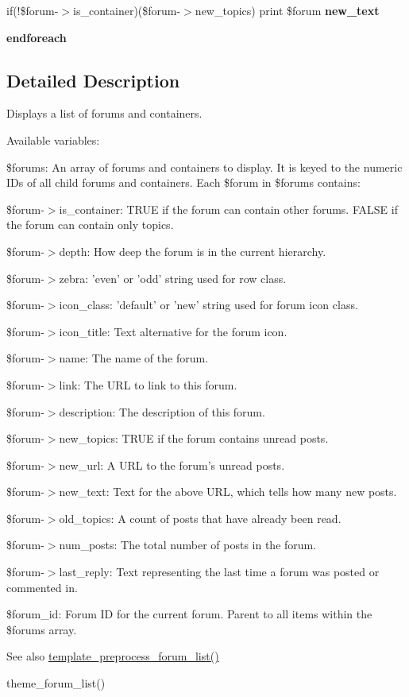 \begin{DoxyCompactItemize}
\item 
\hypertarget{forum-list_8tpl_8php_ae02958244c63e6b4c4a07e5efe312478}{
if(!\$forum-\/$>$is\_\-container)(\$forum-\/$>$new\_\-topics) print \$forum {\bfseries new\_\-text}}
\label{forum-list_8tpl_8php_ae02958244c63e6b4c4a07e5efe312478}

\item 
\hypertarget{forum-list_8tpl_8php_a672d9707ef91db026c210f98cc601123}{
{\bfseries endforeach}}
\label{forum-list_8tpl_8php_a672d9707ef91db026c210f98cc601123}

\end{DoxyCompactItemize}


\subsection{Detailed Description}
Displays a list of forums and containers.

Available variables:
\begin{DoxyItemize}
\item \$forums: An array of forums and containers to display. It is keyed to the numeric IDs of all child forums and containers. Each \$forum in \$forums contains:
\begin{DoxyItemize}
\item \$forum-\/$>$is\_\-container: TRUE if the forum can contain other forums. FALSE if the forum can contain only topics.
\item \$forum-\/$>$depth: How deep the forum is in the current hierarchy.
\item \$forum-\/$>$zebra: 'even' or 'odd' string used for row class.
\item \$forum-\/$>$icon\_\-class: 'default' or 'new' string used for forum icon class.
\item \$forum-\/$>$icon\_\-title: Text alternative for the forum icon.
\item \$forum-\/$>$name: The name of the forum.
\item \$forum-\/$>$link: The URL to link to this forum.
\item \$forum-\/$>$description: The description of this forum.
\item \$forum-\/$>$new\_\-topics: TRUE if the forum contains unread posts.
\item \$forum-\/$>$new\_\-url: A URL to the forum's unread posts.
\item \$forum-\/$>$new\_\-text: Text for the above URL, which tells how many new posts.
\item \$forum-\/$>$old\_\-topics: A count of posts that have already been read.
\item \$forum-\/$>$num\_\-posts: The total number of posts in the forum.
\item \$forum-\/$>$last\_\-reply: Text representing the last time a forum was posted or commented in.
\end{DoxyItemize}
\item \$forum\_\-id: Forum ID for the current forum. Parent to all items within the \$forums array.
\end{DoxyItemize}

\begin{DoxySeeAlso}{See also}
\hyperlink{forum_8module_ad3b69c5d2f0cbf90157149bf0c8f21a5}{template\_\-preprocess\_\-forum\_\-list()} 

theme\_\-forum\_\-list() 
\end{DoxySeeAlso}
